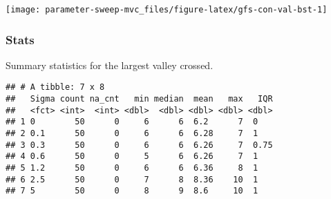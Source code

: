 \documentclass[]{book}
\newenvironment{Shaded}{\begin{snugshade}}{\end{snugshade}}
\newcommand{\DataTypeTok}[1]{\textcolor[rgb]{0.13,0.29,0.53}{#1}}
\newcommand{\KeywordTok}[1]{\textcolor[rgb]{0.13,0.29,0.53}{\textbf{#1}}}
\newcommand{\NormalTok}[1]{#1}
\newcommand{\OperatorTok}[1]{\textcolor[rgb]{0.81,0.36,0.00}{\textbf{#1}}}
\newcommand{\OtherTok}[1]{\textcolor[rgb]{0.56,0.35,0.01}{#1}}
\newcommand{\StringTok}[1]{\textcolor[rgb]{0.31,0.60,0.02}{#1}}
\begin{document}
\texttt{[image: parameter-sweep-mvc\_files/figure-latex/gfs-con-val-bst-1]}

\hypertarget{stats-26}{%
\subsubsection{Stats}\label{stats-26}}

Summary statistics for the largest valley crossed.

\begin{Shaded}
\end{Shaded}

\begin{verbatim}
## # A tibble: 7 x 8
##   Sigma count na_cnt   min median  mean   max   IQR
##   <fct> <int>  <int> <dbl>  <dbl> <dbl> <dbl> <dbl>
## 1 0        50      0     6      6  6.2      7  0   
## 2 0.1      50      0     6      6  6.28     7  1   
## 3 0.3      50      0     6      6  6.26     7  0.75
## 4 0.6      50      0     5      6  6.26     7  1   
## 5 1.2      50      0     6      6  6.36     8  1   
## 6 2.5      50      0     7      8  8.36    10  1   
## 7 5        50      0     8      9  8.6     10  1
\end{verbatim}
\end{document}
